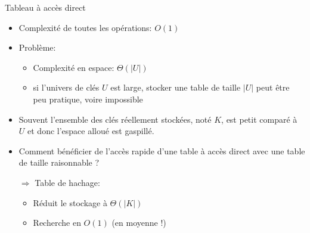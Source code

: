 \begin{frame}{Tableau à accès direct}

\begin{itemize}
\item Complexité de toutes les opérations: $O(1)$
\item Problème:
\begin{itemize}
\item Complexité en espace: $\Theta(|U|)$
\item si l'univers de clés $U$ est large, stocker une table de taille $|U|$ peut être peu pratique, voire impossible
\end{itemize}
\item Souvent l'ensemble des clés réellement stockées, noté $K$, est petit comparé à $U$ et donc l'espace alloué est gaspillé.

\bigskip\bigskip

\item Comment bénéficier de l'accès rapide d'une table à accès direct avec une table de taille raisonnable ?\\

\medskip

$\Rightarrow$ \alert{Table de hachage:}
\begin{itemize}
\item Réduit le stockage à $\Theta(|K|)$
\item Recherche en $O(1)$ (\alert{en moyenne} !)
\end{itemize}
\end{itemize}
\end{frame}

